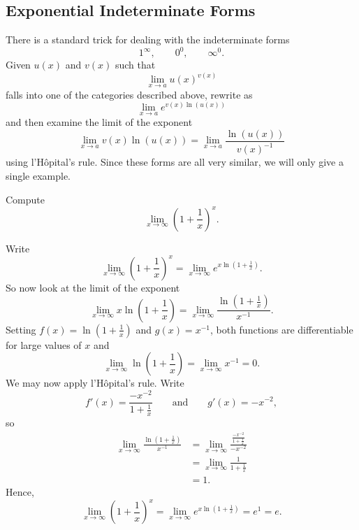\documentclass{ximera}
\begin{document}
\subsection*{Exponential Indeterminate Forms}

There is a standard trick for dealing with the indeterminate forms
\[
1^\infty,\qquad 0^0,\qquad \infty^0.
\]
Given $u(x)$ and $v(x)$ such that
\[
\lim_{x\to a}u(x)^{v(x)}
\]
falls into one of the categories described above, rewrite as
\[
\lim_{x\to a}e^{v(x)\ln(u(x))}
\]
and then examine the limit of the exponent
\[
\lim_{x\to a} v(x)\ln(u(x)) = \lim_{x\to a} \frac{\ln(u(x))}{v(x)^{-1}}
\]
using l'H\^opital's rule.  Since these forms are all very similar, we
will only give a single example.


\begin{example}
Compute
\[
\lim_{x\to \infty}\left(1 + \frac{1}{x}\right)^x.
\]


Write
\[
\lim_{x\to \infty}\left(1 + \frac{1}{x}\right)^x = \lim_{x\to \infty}e^{x\ln\left(1 + \frac{1}{x}\right)}.
\]
So now look at the limit of the exponent
\[
\lim_{x\to\infty} x\ln\left(1 + \frac{1}{x}\right) = \lim_{x\to\infty} \frac{\ln\left(1 + \frac{1}{x}\right)}{x^{-1}}.
\]
Setting $f(x) = \ln\left(1 + \frac{1}{x}\right)$ and $g(x) = x^{-1}$,
both functions are differentiable for large values of $x$ and
\[
\lim_{x\to \infty}\ln\left(1 + \frac{1}{x}\right)=\lim_{x\to \infty}x^{-1} = 0.
\]
We may now apply l'H\^opital's rule. Write
\[
f'(x) = \frac{-x^{-2}}{1 + \frac{1}{x}}\qquad\text{and}\qquad g'(x) = -x^{-2},
\]
so
\begin{align*}
\lim_{x\to\infty} \frac{\ln\left(1 + \frac{1}{x}\right)}{x^{-1}} &= \lim_{x\to\infty} \frac{\frac{-x^{-2}}{1 + \frac{1}{x}}}{-x^{-2}} \\
&=\lim_{x\to\infty} \frac{1}{1 + \frac{1}{x}}\\
&=1.
\end{align*}
Hence, 
\[
\lim_{x\to \infty}\left(1 + \frac{1}{x}\right)^x = \lim_{x\to \infty}e^{x\ln\left(1 + \frac{1}{x}\right)} =e^{1} = e.
\]
\end{example}
\end{document}
